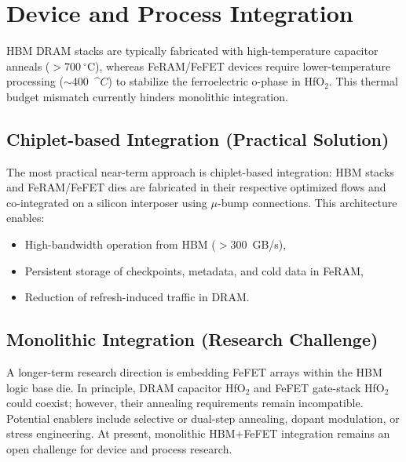 \section{Device and Process Integration}
HBM DRAM stacks are typically fabricated with high-temperature capacitor anneals ($>700~^\circ$C),
whereas FeRAM/FeFET devices require lower-temperature processing ($\sim$400~^\circ$C$) to stabilize the ferroelectric o-phase in HfO$_2$.
This thermal budget mismatch currently hinders monolithic integration.

\subsection{Chiplet-based Integration (Practical Solution)}
The most practical near-term approach is chiplet-based integration:
HBM stacks and FeRAM/FeFET dies are fabricated in their respective optimized flows and co-integrated on a silicon interposer using $\mu$-bump connections.
This architecture enables:
\begin{itemize}
  \item High-bandwidth operation from HBM ($>$300~GB/s),
  \item Persistent storage of checkpoints, metadata, and cold data in FeRAM,
  \item Reduction of refresh-induced traffic in DRAM.
\end{itemize}

\subsection{Monolithic Integration (Research Challenge)}
A longer-term research direction is embedding FeFET arrays within the HBM logic base die.
In principle, DRAM capacitor HfO$_2$ and FeFET gate-stack HfO$_2$ could coexist; however, their annealing requirements remain incompatible.
Potential enablers include selective or dual-step annealing, dopant modulation, or stress engineering.
At present, monolithic HBM+FeFET integration remains an open challenge for device and process research.

